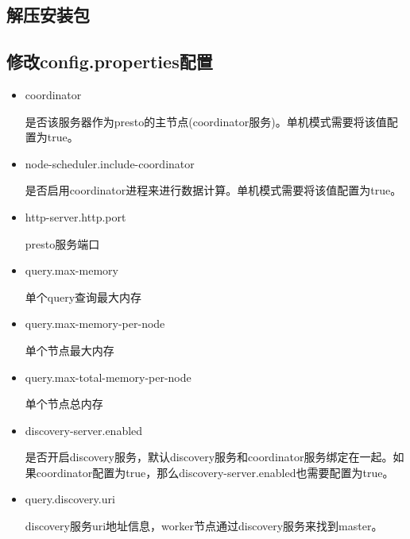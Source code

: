 \documentclass[letterpaper,10pt,english]{sphinxmanual}
\begin{document}
\subsection{解压安装包}
\label{\detokenize{installation/standardlone:id2}}
\begin{sphinxVerbatim}[commandchars=\\\{\}]
    
\end{sphinxVerbatim}

\noindent{}


\subsection{修改config.properties配置}
\label{\detokenize{installation/standardlone:config-properties}}
\noindent{}
\begin{itemize}
\item {} 
coordinator

是否该服务器作为presto的主节点(coordinator服务)。单机模式需要将该值配置为true。

\item {} 
node-scheduler.include-coordinator

是否启用coordinator进程来进行数据计算。单机模式需要将该值配置为true。

\item {} 
http-server.http.port

presto服务端口

\item {} 
query.max-memory

单个query查询最大内存

\item {} 
query.max-memory-per-node

单个节点最大内存

\item {} 
query.max-total-memory-per-node

单个节点总内存

\item {} 
discovery-server.enabled

是否开启discovery服务，默认discovery服务和coordinator服务绑定在一起。如果coordinator配置为true，那么discovery-server.enabled也需要配置为true。

\item {} 
query.discovery.uri

discovery服务uri地址信息，worker节点通过discovery服务来找到master。

\end{itemize}
\end{document}
